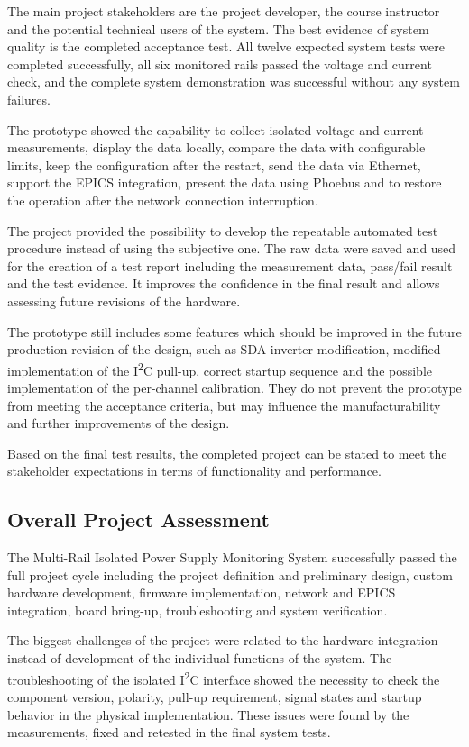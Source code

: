 The main project stakeholders are the project developer, the course instructor and the potential technical users of the system. The best evidence of system quality is the completed acceptance test. All twelve expected system tests were completed successfully, all six monitored rails passed the voltage and current check, and the complete system demonstration was successful without any system failures.

The prototype showed the capability to collect isolated voltage and current measurements, display the data locally, compare the data with configurable limits, keep the configuration after the restart, send the data via Ethernet, support the EPICS integration, present the data using Phoebus and to restore the operation after the network connection interruption.

The project provided the possibility to develop the repeatable automated test procedure instead of using the subjective one. The raw data were saved and used for the creation of a test report including the measurement data, pass/fail result and the test evidence. It improves the confidence in the final result and allows assessing future revisions of the hardware.

The prototype still includes some features which should be improved in the future production revision of the design, such as SDA inverter modification, modified implementation of the I\textsuperscript{2}C pull-up, correct startup sequence and the possible implementation of the per-channel calibration. They do not prevent the prototype from meeting the acceptance criteria, but may influence the manufacturability and further improvements of the design.

Based on the final test results, the completed project can be stated to meet the stakeholder expectations in terms of functionality and performance.

\subsection{Overall Project Assessment}

The Multi-Rail Isolated Power Supply Monitoring System successfully passed the full project cycle including the project definition and preliminary design, custom hardware development, firmware implementation, network and EPICS integration, board bring-up, troubleshooting and system verification.

The biggest challenges of the project were related to the hardware integration instead of development of the individual functions of the system. The troubleshooting of the isolated I\textsuperscript{2}C interface showed the necessity to check the component version, polarity, pull-up requirement, signal states and startup behavior in the physical implementation. These issues were found by the measurements, fixed and retested in the final system tests.


